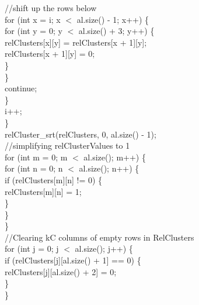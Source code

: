 \begin{ttfamily   }
\begin{scriptsize}
	\noindent//shift up the rows below\\
                \noindent for (int x = i; x $<$ al.size() - 1; x++) \{\\
                    \noindent for (int y = 0; y $<$ al.size() + 3; y++) \{\\
                        relClusters[x][y] = relClusters[x + 1][y];\\
                        relClusters[x + 1][y] = 0;\\
                    \}\\
                \}\\
                continue;\\
            \}\\
            i++;\\
        \}\\
        
        \noindent 
        relCluster\_srt(relClusters, 0, al.size() - 1);\\
        
        \noindent//simplifying relClusterValues to 1\\
        \noindent for (int m = 0;    m $<$ al.size();    m++) \{\\
            \noindent for (int n = 0; n $<$ al.size(); n++) \{\\
                if (relClusters[m][n] != 0) \{\\
                    relClusters[m][n] = 1;\\
                \}\\
            \}\\
        \}\\

        \noindent//Clearing kC columns of empty rows in RelClusters\\
        \noindent for (int j = 0;   j $<$ al.size();   j++) \{\\
            if (relClusters[j][al.size() + 1] == 0) \{\\
                relClusters[j][al.size() + 2] = 0;\\
            \}\\
        \}\\
        


\end{scriptsize}
\end{ttfamily   }
